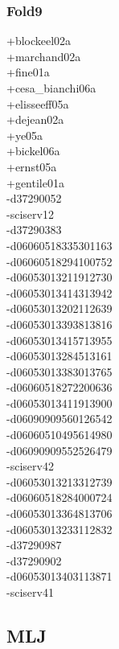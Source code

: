 \begin{multicols}{4}
\subsubsection*{Fold9}
+blockeel02a\\
+marchand02a\\
+fine01a\\
+cesa\_bianchi06a\\
+elisseeff05a\\
+dejean02a\\
+ye05a\\
+bickel06a\\
+ernst05a\\
+gentile01a\\
-d37290052\\
-sciserv12\\
-d37290383\\
-d06060518335301163\\
-d06060518294100752\\
-d06053013211912730\\
-d06053013414313942\\
-d06053013202112639\\
-d06053013393813816\\
-d06053013415713955\\
-d06053013284513161\\
-d06053013383013765\\
-d06060518272200636\\
-d06053013411913900\\
-d06090909560126542\\
-d06060510495614980\\
-d06090909552526479\\
-sciserv42\\
-d06053013213312739\\
-d06060518284000724\\
-d06053013364813706\\
-d06053013233112832\\
-d37290987\\
-d37290902\\
-d06053013403113871\\
-sciserv41\\
\subsection*{MLJ}

\end{multicols}
